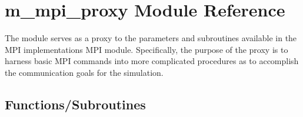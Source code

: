 \hypertarget{namespacem__mpi__proxy}{}\section{m\+\_\+mpi\+\_\+proxy Module Reference}
\label{namespacem__mpi__proxy}


The module serves as a proxy to the parameters and subroutines available in the M\+PI implementation\textquotesingle{}s M\+PI module. Specifically, the purpose of the proxy is to harness basic M\+PI commands into more complicated procedures as to accomplish the communication goals for the simulation.  


\subsection*{Functions/\+Subroutines}

